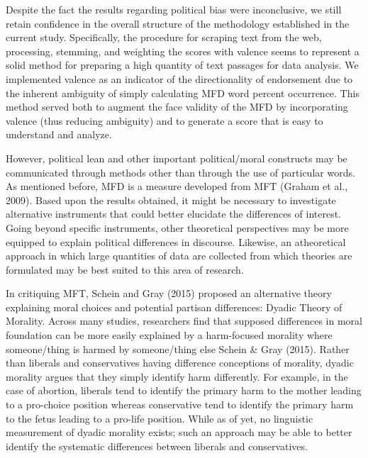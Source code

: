\documentclass[
  man,floatsintext]{apa6}
\begin{document}
Despite the fact the results regarding political bias were inconclusive, we still retain confidence in the overall structure of the methodology established in the current study. Specifically, the procedure for scraping text from the web, processing, stemming, and weighting the scores with valence seems to represent a solid method for preparing a high quantity of text passages for data analysis. We implemented valence as an indicator of the directionality of endorsement due to the inherent ambiguity of simply calculating MFD word percent occurrence. This method served both to augment the face validity of the MFD by incorporating valence (thus reducing ambiguity) and to generate a score that is easy to understand and analyze.

However, political lean and other important political/moral constructs may be communicated through methods other than through the use of particular words. As mentioned before, MFD is a measure developed from MFT (Graham et al., 2009). Based upon the results obtained, it might be necessary to investigate alternative instruments that could better elucidate the differences of interest. Going beyond specific instruments, other theoretical perspectives may be more equipped to explain political differences in discourse. Likewise, an atheoretical approach in which large quantities of data are collected from which theories are formulated may be best suited to this area of research.

In critiquing MFT, Schein and Gray (2015) proposed an alternative theory explaining moral choices and potential partisan differences: Dyadic Theory of Morality. Across many studies, researchers find that supposed differences in moral foundation can be more easily explained by a harm-focused morality where someone/thing is harmed by someone/thing else Schein \& Gray (2015). Rather than liberals and conservatives having difference conceptions of morality, dyadic morality argues that they simply identify harm differently. For example, in the case of abortion, liberals tend to identify the primary harm to the mother leading to a pro-choice position whereas conservative tend to identify the primary harm to the fetus leading to a pro-life position. While as of yet, no linguistic measurement of dyadic morality exists; such an approach may be able to better identify the systematic differences between liberals and conservatives.
\end{document}

